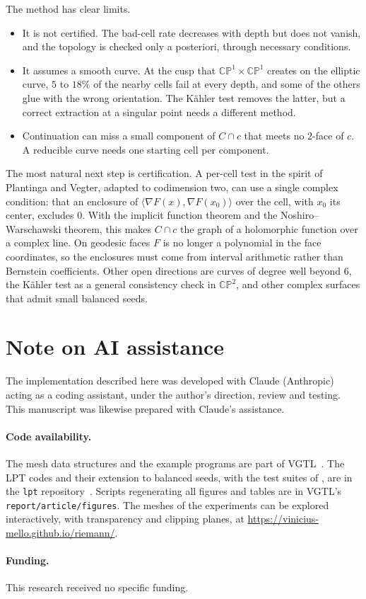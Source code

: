 \documentclass[11pt]{article}
\theoremstyle{plain}
\theoremstyle{definition}
\theoremstyle{remark}
\newcommand{\CP}{\mathbb{CP}}
\begin{document}
The method has clear limits.
\begin{itemize}[itemsep=1pt]
\item It is not certified. The bad-cell rate decreases with depth but does
  not vanish, and the topology is checked only a posteriori, through
  necessary conditions.
\item It assumes a smooth curve. At the cusp that $\CP^1\times\CP^1$
  creates on the elliptic curve, $5$ to $18\%$ of the nearby cells fail at
  every depth, and some of the others glue with the wrong orientation. The
  Kähler test removes the latter, but a correct extraction at a singular
  point needs a different method.
\item Continuation can miss a small component of $C\cap c$ that meets no
  $2$-face of $c$. A reducible curve needs one starting cell per
  component.
\end{itemize}
The most natural next step is certification. A per-cell test in the
spirit of Plantinga and Vegter, adapted to codimension two, can use a
single complex condition: that an enclosure of
$\langle\nabla F(x),\nabla F(x_0)\rangle$ over the cell, with $x_0$ its
center, excludes $0$. With the implicit function theorem and the
Noshiro--Warschawski theorem, this makes $C\cap c$ the graph of a
holomorphic function over a complex line. On geodesic faces $F$ is no longer a
polynomial in the face coordinates, so the enclosures must come from
interval arithmetic rather than Bernstein coefficients. Other open
directions are curves of degree well beyond $6$, the Kähler test as a general
consistency check in $\CP^2$, and other complex surfaces that admit small
balanced seeds.

\section*{Note on AI assistance}
The implementation described here was developed with Claude (Anthropic)
acting as a coding assistant, under the author's direction, review and
testing. This manuscript was likewise prepared with Claude's assistance.

\paragraph{Code availability.}
The mesh data structures and the example programs are part of
VGTL~\cite{vgtl}. The LPT codes and their extension to balanced seeds,
with the test suites of , are in the \texttt{lpt}
repository~\cite{lptcode}. Scripts regenerating all figures and tables
are in VGTL's \texttt{report/article/figures}. The meshes of the experiments
can be explored interactively, with transparency and clipping planes, at
\url{https://vinicius-mello.github.io/riemann/}.

\paragraph{Funding.} This research received no specific funding.



\end{document}
